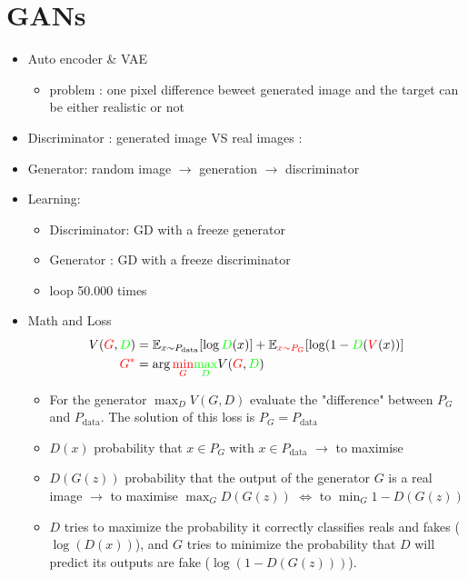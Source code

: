 \documentclass{article}
\theoremstyle{plain}%
\theoremstyle{definition}
\theoremstyle{remark}
\begin{document}
\section{GANs}
\begin{itemize}
    \item Auto encoder \& VAE \begin{itemize}
        \item problem : one pixel difference beweet generated image and the target can be either realistic or not
    \end{itemize}
    \item Discriminator : generated image VS real images :
    \item Generator: random image $\rightarrow$ generation $\rightarrow$ discriminator
    \item Learning: \begin{itemize}
        \item Discriminator: GD with a freeze generator
        \item Generator : GD with a freeze discriminator
        \item loop 50.000 times
    \end{itemize}
    \item Math and Loss \begin{align*}
        V(\textcolor{red}{G}, \textcolor{green}{D}) & = \mathbb{E}_{x\sim P_{\text{data}}}[\log \textcolor{green}{D}(x)] + \mathbb{E}_{\textcolor{red}{x\sim P_G}}[\log(1 - \textcolor{green}{D}(\textcolor{red}{V}(x))] \\
        \textcolor{red}{G^*}                        & = \arg \textcolor{red}{\min_{G}} \textcolor{green}{\max_{D}} V(\textcolor{red}{G}, \textcolor{green}{D})
    \end{align*} \begin{itemize}
        \item For the generator $ \max _D V(G,D) $ evaluate the "difference" between $ P_G $ and $ P_{\text{data}} $. The solution of this loss is $ P_G = P_{\text{data}} $ 
        \item $ D(x) $ probability that $ x \in P_G $ with $ x \in P_{\text{data}} $  $\rightarrow$ to maximise
        \item $ D(G(z)) $ probability that the output of the generator $ G $  is a real image $\rightarrow$ to maximise $ \max _G D(G(z)) $  $ \Leftrightarrow $ to $ \min _G 1 - D(G(z)) $  
        \item \( D \) tries to maximize the probability it correctly classifies reals and fakes (\( \log(D(x)) \)), and \( G \) tries to minimize the probability that \( D \) will predict its outputs are fake (\( \log(1 - D(G(z))) \)).

\end{itemize}
\end{itemize}
\end{document}
